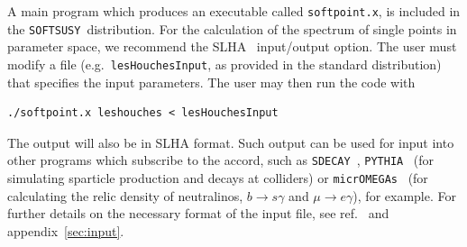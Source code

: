 \documentclass{article}
\def\SOFTSUSY{{\tt SOFTSUSY}}
\def\code#1{\small{\tt #1}\normalsize}
\begin{document}
A main program which produces an executable called
\code{softpoint.x}, is included in the
\SOFTSUSY~distribution. For the calculation of the spectrum of single points
in parameter space, we recommend the
SLHA~\cite{lhacc} input/output 
option. The user must modify a
file (e.g.\ \code{lesHouchesInput}, as provided in the standard distribution)
that specifies the input parameters. The user may then run the code with 
\small\begin{verbatim}
./softpoint.x leshouches < lesHouchesInput
\end{verbatim}
\normalsize
The output will also be in
SLHA format. Such output can be used for input into other programs  
which subscribe to the accord, such as \code{SDECAY}~\cite{sdecay},
\code{PYTHIA}~\cite{pythia} (for 
simulating sparticle production and decays at colliders) or
\code{micrOMEGAs}~\cite{micromegas} (for
calculating the relic density of neutralinos, $b\rightarrow s \gamma$ and
$\mu \rightarrow e \gamma$), for example. For further details on the necessary
format of the input file, see ref.~\cite{lhacc} and appendix~\ref{sec:input}. 
\end{document}
